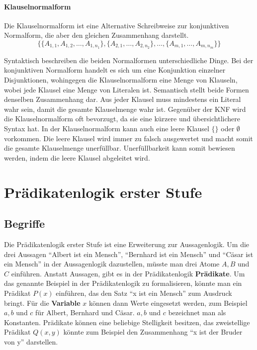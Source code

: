 \paragraph{Klauselnormalform}
Die Klauselnormalform ist eine Alternative Schreibweise zur konjunktiven Normalform, die aber den gleichen Zusammenhang darstellt.
$$\{\{A_{1,1},A_{1,2},\ldots,A_{1,n_1}\},
\{A_{2,1},\ldots,A_{2,n_2}\},\ldots,
\{A_{m,1},\ldots,A_{m,n_m}\}\}$$

Syntaktisch beschreiben die beiden Normalformen unterschiedliche Dinge. Bei der konjunktiven Normalform handelt es sich um eine Konjunktion einzelner Disjunktionen, wohingegen die Klauselnormalform eine Menge von Klauseln, wobei jede Klausel eine Menge von Literalen ist.
Semantisch stellt beide Formen denselben Zusammenhang dar. Aus jeder Klausel muss mindestens ein Literal wahr sein, damit die gesamte Klauselmenge wahr ist.
Gegenüber der KNF wird die Klauselnormalform oft bevorzugt, da sie eine kürzere und übersichtlichere Syntax hat. In der Klauselnormalform kann auch eine leere Klausel $\{\}$ oder $\emptyset$ vorkommen. Die leere Klausel wird immer zu falsch ausgewertet und macht somit die gesamte Klauselmenge unerfüllbar. Unerfüllbarkeit kann somit bewiesen werden, indem die leere Klausel abgeleitet wird.

	\section{Prädikatenlogik erster Stufe}
		\subsection{Begriffe}

Die Prädikatenlogik erster Stufe ist eine Erweiterung zur Aussagenlogik. Um die drei Aussagen "`Albert ist ein Mensch"', "`Bernhard ist ein Mensch"' und "`Cäsar ist ein Mensch"' in der Aussagenlogik dazustellen, müsste man drei Atome $A, B$ und $C$ einführen. Anstatt Aussagen, gibt es in der Prädikatenlogik \textbf{Prädikate}. Um das genannte Beispiel in der Prädikatenlogik zu formalisieren, könnte man ein Prädikat $P(x)$ einführen, das den Satz "`x ist ein Mensch"' zum Ausdruck bringt. Für die \textbf{Variable} $x$ können dann Werte eingesetzt werden, zum Beispiel $a, b$ und $c$ für Albert, Bernhard und Cäsar. $a, b$ und $c$ bezeichnet man als Konstanten.
Prädikate können eine beliebige Stelligkeit besitzen, das zweistellige Prädikat $Q(x,y)$ könnte zum Beispiel den Zusammenhang "`x ist der Bruder von y"' darstellen.

